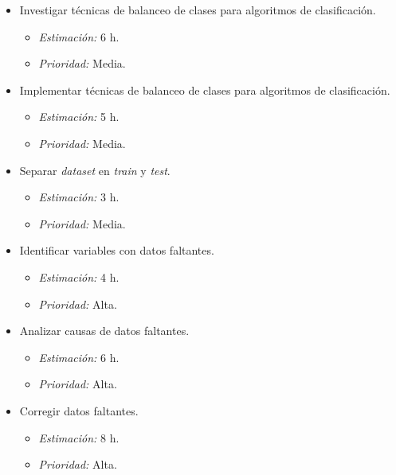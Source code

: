 \documentclass[
11pt, %
]{charter}
\begin{document}
\begin{itemize}
\begin{itemize}
            \item Investigar técnicas de balanceo de clases para algoritmos de clasificación.
                \begin{itemize}
                    \item \textit{Estimación:} 6 h.
                    \item \textit{Prioridad:} Media.
                \end{itemize}
            \item Implementar técnicas de balanceo de clases para algoritmos de clasificación.
                \begin{itemize}
                    \item \textit{Estimación:} 5 h.
                    \item \textit{Prioridad:} Media.
                \end{itemize}
            \item Separar \textit{dataset} en \textit{train} y \textit{test}.
                \begin{itemize}
                    \item \textit{Estimación:} 3 h.
                    \item \textit{Prioridad:} Media.
                \end{itemize}
            \item Identificar variables con datos faltantes.
                \begin{itemize}
                    \item \textit{Estimación:} 4 h.
                    \item \textit{Prioridad:} Alta.
                \end{itemize}
            \item Analizar causas de datos faltantes.
                \begin{itemize}
                    \item \textit{Estimación:} 6 h.
                    \item \textit{Prioridad:} Alta.
                \end{itemize}
            \item Corregir datos faltantes.
                \begin{itemize}
                    \item \textit{Estimación:} 8 h.
                    \item \textit{Prioridad:} Alta.
                \end{itemize}

\end{itemize}
\end{itemize}
\end{document}
